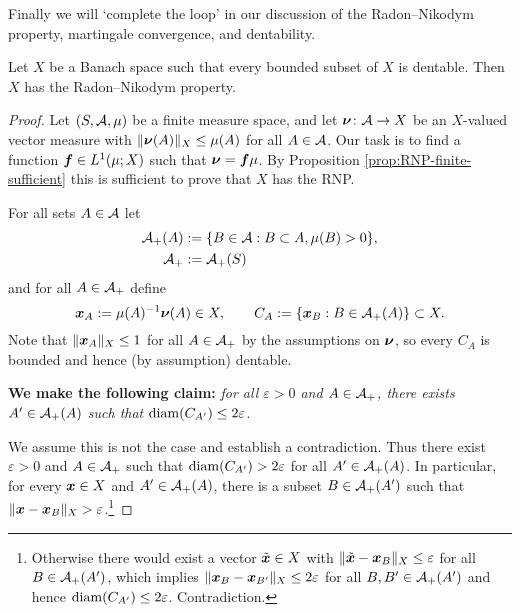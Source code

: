 Finally we will `complete the loop' in our discussion of the Radon--Nikodym property, martingale convergence, and dentability.

\begin{thm}\label{thm:dent-RNP}
  Let $X$ be a Banach space such that every bounded subset of $X$ is dentable.
  Then $X$ has the Radon--Nikodym property.
\end{thm}

\begin{proof}
  Let $(S,\mathcal{A},\mu)$ be a finite measure space, and let $\bm{\nu} \colon \mathcal{A} \rightarrow X$ be an $X$-valued vector measure with $\|\bm{\nu}(A)\|_{X} \leq \mu(A)$ for all $A \in \mathcal{A}$.
  Our task is to find a function $\bm{f} \in L^1(\mu;X)$ such that $\bm{\nu} = \bm{f}\mu$.
  By Proposition \ref{prop:RNP-finite-sufficient} this is sufficient to prove that $X$ has the RNP.

  For all sets $A \in \mathcal{A}$ let
  \begin{equation*}
    \begin{aligned}
      \mathcal{A}_{+}(A) &:= \{B \in \mathcal{A} : B \subset A, \mu(B) > 0\}, \\
      \mathcal{A}_{+} &:= \mathcal{A}_{+}(S)
    \end{aligned}
  \end{equation*}
  and for all $A \in \mathcal{A}_{+}$ define
  \begin{equation*}
    \bm{x}_{A} := \mu(A)^{-1} \bm{\nu}(A)\in X, \qquad 
    C_{A} := \{ \bm{x}_{B} : B \in \mathcal{A}_{+}(A)\} \subset X.
  \end{equation*}
  Note that $\|\bm{x}_{A}\|_X \leq 1$ for all $A \in \mathcal{A}_{+}$ by the assumptions on $\bm{\nu}$, so every $C_{A}$ is bounded and hence (by assumption) dentable.

  \textbf{We make the following claim:} \emph{for all $\varepsilon > 0$ and $A \in \mathcal{A}_{+}$, there exists $A' \in \mathcal{A}_+(A)$ such that $\operatorname{diam}(C_{A'}) \leq 2\varepsilon$.}
  
  We assume this is not the case and establish a contradiction.
  Thus there exist $\varepsilon > 0$ and $A \in \mathcal{A}_{+}$ such that $\operatorname{diam}(C_{A'}) > 2\varepsilon$ for all $A' \in \mathcal{A}_+(A)$.
  In particular, for every $\bm{x} \in X$ and $A' \in \mathcal{A}_{+}(A)$, there is a subset $B \in \mathcal{A}_{+}(A')$ such that $\|\bm{x} - \bm{x}_{B}\|_{X} > \varepsilon$.\footnote{Otherwise there would exist a vector $\tilde{\bm{x}} \in X$ with $\|\tilde{\bm{x}} - \bm{x}_{B}\|_{X} \leq \varepsilon$ for all $B \in \mathcal{A}_{+}(A')$, which implies $\|\bm{x}_{B} - \bm{x}_{B'}\|_{X} \leq 2\varepsilon$ for all $B,B' \in \mathcal{A}_+(A')$ and hence $\operatorname{diam}(C_{A'}) \leq 2\varepsilon$. Contradiction.}
  

\end{proof}
